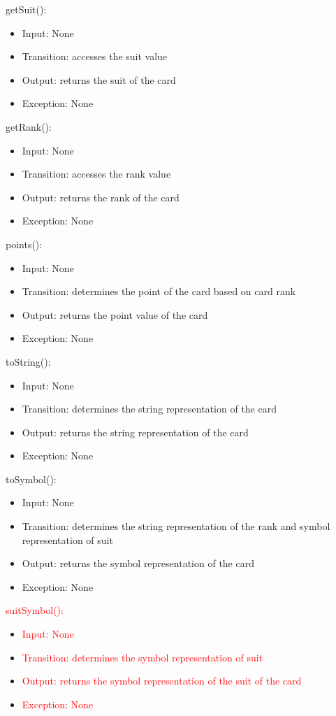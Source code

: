 \documentclass[12pt, titlepage]{article}
\begin{document}
getSuit():
\begin{itemize}
    \item Input: None
    \item Transition: accesses the suit value
    \item Output: returns the suit of the card
    \item Exception: None
\end{itemize}

\noindent getRank():
\begin{itemize}
    \item Input: None
    \item Transition: accesses the rank value
    \item Output: returns the rank of the card
    \item Exception: None
\end{itemize}

\noindent points():
\begin{itemize}
    \item Input: None
    \item Transition: determines the point of the card based on card rank
    \item Output: returns the point value of the card
    \item Exception: None
\end{itemize}

\noindent toString():
\begin{itemize}
    \item Input: None
    \item Transition: determines the string representation of the card
    \item Output: returns the string representation of the card
    \item Exception: None
\end{itemize}

\noindent toSymbol():
\begin{itemize}
    \item Input: None
    \item Transition: determines the string representation of the rank and symbol representation of suit
    \item Output: returns the symbol representation of the card
    \item Exception: None
\end{itemize}

\noindent \textcolor{red}{suitSymbol():}
\begin{itemize}
    \item \textcolor{red}{Input: None}
    \item \textcolor{red}{Transition: determines the symbol representation of suit}
    \item \textcolor{red}{Output: returns the symbol representation of the suit of the card}
    \item \textcolor{red}{Exception: None}
\end{itemize}
\end{document}
